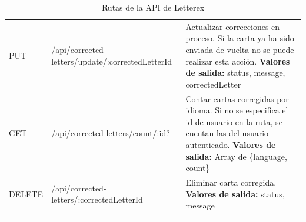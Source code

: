 \begin{longtable}{|l|p{5cm}|p{8cm}|}
PUT & /api/corrected-letters/update/:corrected\-Letter\-Id & Actualizar correcciones en proceso. Si la carta ya ha sido enviada de vuelta no se puede realizar esta acción. \newline \textbf{Valores de salida:} status, message, correctedLetter \\
GET & /api/corrected-letters/count/:id? & Contar cartas corregidas por idioma. Si no se especifica el id de usuario en la ruta, se cuentan las del usuario autenticado. \newline \textbf{Valores de salida:} Array de \{language, count\} \\
DELETE & /api/corrected-letters/:corrected\-Letter\-Id & Eliminar carta corregida. \newline \textbf{Valores de salida:} status, message \\
\hline
\caption{Rutas de la API de Letterex}
\label{tab:rutas-api}
\end{longtable}

